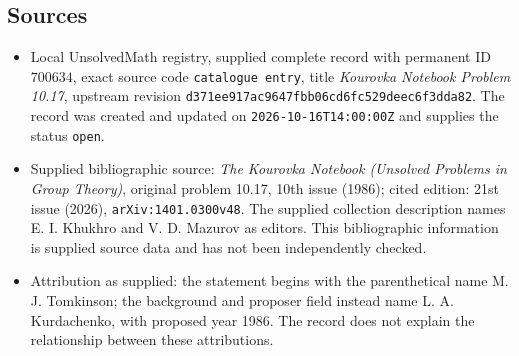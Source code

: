 \documentclass[11pt]{article}
\begin{document}
\subsection{Sources}
\begin{itemize}
\item Local UnsolvedMath registry, supplied complete record with permanent ID \(700634\), exact source code \texttt{catalogue entry}, title \emph{Kourovka Notebook Problem 10.17}, upstream revision \texttt{d371ee917ac9647fbb06cd6fc529deec6f3dda82}. The record was created and updated on \texttt{2026-10-16T14:00:00Z} and supplies the status \texttt{open}.
\item Supplied bibliographic source: \emph{The Kourovka Notebook (Unsolved Problems in Group Theory)}, original problem 10.17, 10th issue (1986); cited edition: 21st issue (2026), \texttt{arXiv:1401.0300v48}. The supplied collection description names E. I. Khukhro and V. D. Mazurov as editors. This bibliographic information is supplied source data and has not been independently checked.
\item Attribution as supplied: the statement begins with the parenthetical name M. J. Tomkinson; the background and proposer field instead name L. A. Kurdachenko, with proposed year 1986. The record does not explain the relationship between these attributions.
\end{itemize}
\end{document}
